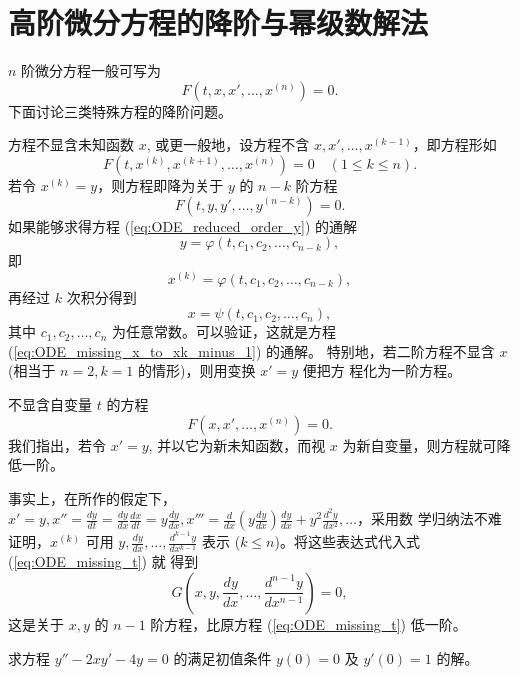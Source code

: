 \section{高阶微分方程的降阶与幂级数解法}\label{sec:高阶微分方程的降阶与幂级数解法}
$n$ 阶微分方程一般可写为
$$F(t,x,x',\dots,x^{(n)})=0.$$
下面讨论三类特殊方程的降阶问题。

\begin{example}[第一类可降阶的方程]\label{ex:第一类可降阶的方程}
    方程不显含未知函数 $x$, 或更一般地，设方程不含 $x,x',\dots,x^{(k-1)}$，即方程形如
\begin{equation}
F(t,x^{(k)},x^{(k+1)},\dots,x^{(n)})=0 \quad (1 \le k \le n). \label{eq:ODE_missing_x_to_xk_minus_1}
\end{equation}
若令 $x^{(k)}=y$，则方程即降为关于 $y$ 的 $n-k$ 阶方程
\begin{equation}
F(t,y,y',\dots,y^{(n-k)})=0. \label{eq:ODE_reduced_order_y}
\end{equation}
如果能够求得方程 (\ref{eq:ODE_reduced_order_y}) 的通解
$$y=\varphi(t,c_1,c_2,\dots,c_{n-k}),$$
即
$$x^{(k)}=\varphi(t,c_1,c_2,\dots,c_{n-k}),$$
再经过 $k$ 次积分得到
$$x=\psi(t,c_1,c_2,\dots,c_n),$$
其中 $c_1,c_2,\dots,c_n$ 为任意常数。可以验证，这就是方程 (\ref{eq:ODE_missing_x_to_xk_minus_1}) 的通解。
特别地，若二阶方程不显含 $x$ (相当于 $n=2,k=1$ 的情形)，则用变换 $x'=y$ 便把方
程化为一阶方程。
\end{example}

\begin{example}[第二类可降阶的方程]\label{ex:第二类可降阶的方程}
    不显含自变量 $t$ 的方程
\begin{equation}
F(x,x',\dots,x^{(n)})=0. \label{eq:ODE_missing_t}
\end{equation}
我们指出，若令 $x'=y$, 并以它为新未知函数，而视 $x$ 为新自变量，则方程就可降低一阶。

事实上，在所作的假定下，$x'=y, x''=\frac{dy}{dt}=\frac{dy}{dx}\frac{dx}{dt}=y\frac{dy}{dx}, x'''=\frac{d}{dx}\left(y\frac{dy}{dx}\right)\frac{dy}{dx}+y^2\frac{d^2y}{dx^2}, \dots$，采用数
学归纳法不难证明，$x^{(k)}$ 可用 $y, \frac{dy}{dx}, \dots, \frac{d^{k-1}y}{dx^{k-1}}$ 表示 ($k \le n$)。将这些表达式代入式 (\ref{eq:ODE_missing_t}) 就
得到
$$G\left(x,y,\frac{dy}{dx},\dots,\frac{d^{n-1}y}{dx^{n-1}}\right)=0,$$
这是关于 $x,y$ 的 $n-1$ 阶方程，比原方程 (\ref{eq:ODE_missing_t}) 低一阶。
\end{example}

\begin{example}[二阶线性微分方程的幂级数解法]\label{ex:二阶线性微分方程的幂级数解法}
    求方程 $y''-2xy'-4y=0$ 的满足初值条件 $y(0)=0$ 及 $y'(0)=1$ 的解。
\end{example}

